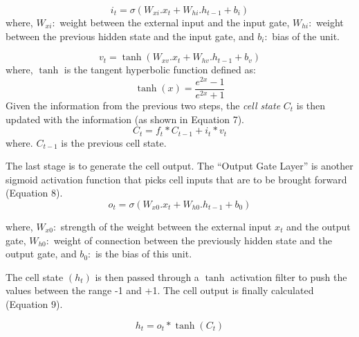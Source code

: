 \documentclass[review]{elsarticle}
\newcommand{\q}[1]{``#1''}
\begin{document}
\begin{equation}\label{key}
i_{t} = \sigma(W_{xi}.x_{t} + W_{hi}.h_{t-1} + b_{i})
\end{equation}
where, \newline
$W_{xi}:$ weight between the external input and the input gate, \newline
$W_{hi}:$ weight between the previous hidden state and the input gate, and \newline $b_{i}:$  bias of the unit.

\begin{equation}\label{key}
v_{t} = \tanh(W_{xv}.x_{t} + W_{hv}.h_{t-1} + b_{v})
\end{equation}
where, \newline
$\tanh$ is the tangent hyperbolic function defined as:
\begin{equation}\label{key}
\tanh(x) = \dfrac{e^{2x} -1 }{e^{2x} + 1 }
\end{equation} 
Given the information from the previous two steps, the \textit{cell state} $C_{t}$ is then  updated with the information (as shown in Equation 7).
\begin{equation}\label{key}
C_{t} = f_{t} * C_{t-1} + i_{t} * v_{t}
\end{equation}
where. \newline $C_{t-1}$ is the previous cell state.

The last stage is to generate the cell output. The \q{Output Gate Layer} is another sigmoid activation function that picks cell inputs that are to be brought forward (Equation 8).
\begin{equation}\label{key}
o_{t} = \sigma(W_{x0}.x_{t} + W_{h0}.h_{t-1} + b_{0})
\end{equation}

where, \newline $W_{x0}:$ strength of the weight between the external input $x_{t}$ and the output gate, \newline 
$W_{h0}:$ weight of connection between the previously hidden state and the output gate, and \newline $b_{0}:$ is the bias of this unit. 

The cell state $(h_{t})$ is then passed through a $\tanh$ activation filter to push the values between the range -1 and +1. The cell output is finally calculated (Equation 9).

\begin{equation}\label{key}
h_{t} = o_{t} * \tanh(C_{t})
\end{equation}
\end{document}
